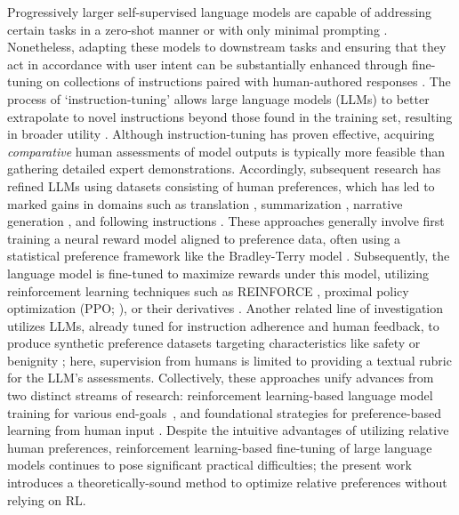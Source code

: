 Progressively larger self-supervised language models are capable of addressing certain tasks in a zero-shot manner \citep{radford2019language} or with only minimal prompting \citep{gpt3,megatron,chowdhery2022palm}. Nonetheless, adapting these models to downstream tasks and ensuring that they act in accordance with user intent can be substantially enhanced through fine-tuning on collections of instructions paired with human-authored responses \citep{mishra-etal-2022-cross,sanh2022multitask,chung2022scaling,thoppilan2022lamda}. The process of `instruction-tuning' allows large language models (LLMs) to better extrapolate to novel instructions beyond those found in the training set, resulting in broader utility \citep{chung2022scaling}. Although instruction-tuning has proven effective, acquiring \textit{comparative} human assessments of model outputs is typically more feasible than gathering detailed expert demonstrations. Accordingly, subsequent research has refined LLMs using datasets consisting of human preferences, which has led to marked gains in domains such as translation \citep{kreutzer-etal-2018-reliability}, summarization \citep{stiennon2022learning,ziegler2020finetuning}, narrative generation \citep{ziegler2020finetuning}, and following instructions \citep{ouyang2022training,ramamurthy2023is}. These approaches generally involve first training a neural reward model aligned to preference data, often using a statistical preference framework like the Bradley-Terry model \citep{bradley1952rankanalysis}. Subsequently, the language model is fine-tuned to maximize rewards under this model, utilizing reinforcement learning techniques such as REINFORCE \citep{williams1992reinforce}, proximal policy optimization (PPO; \cite{schulman2017proximal}), or their derivatives \citep{ramamurthy2023is}. Another related line of investigation utilizes LLMs, already tuned for instruction adherence and human feedback, to produce synthetic preference datasets targeting characteristics like safety or benignity \citep{bai2022constitutional}; here, supervision from humans is limited to providing a textual rubric for the LLM’s assessments. Collectively, these approaches unify advances from two distinct streams of research: reinforcement learning-based language model training for various end-goals~\citep{Ranzato2015SequenceLT,paulus2018a,wu2018learning}, and foundational strategies for preference-based learning from human input \citep{christiano2017deep,kupcsik2018learning}. Despite the intuitive advantages of utilizing relative human preferences, reinforcement learning-based fine-tuning of large language models continues to pose significant practical difficulties; the present work introduces a theoretically-sound method to optimize relative preferences without relying on RL.

